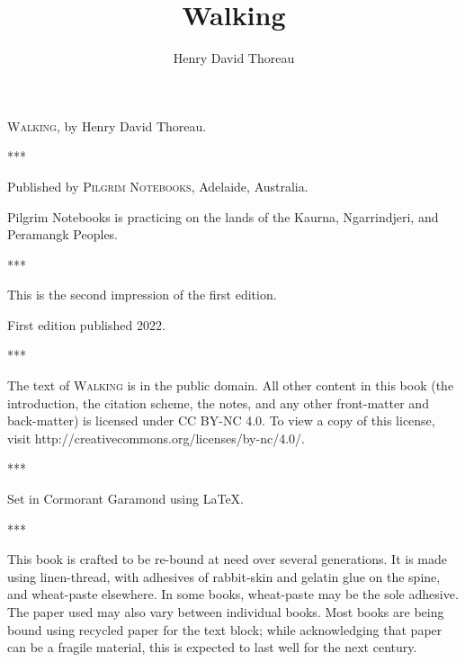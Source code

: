\documentclass[twoside,openright,10pt]{memoir} %
\title{Walking}
\author{Henry David Thoreau}
\date{}
\begin{document}
\mbox{}
\thispagestyle{cleared}
\newpage

\begin{center}
\thispagestyle{cleared}
\small
  \textsc{Walking}, by Henry David Thoreau.

  ***

  Published by \textsc{Pilgrim Notebooks}, Adelaide, Australia.

  Pilgrim Notebooks is practicing on the lands of the Kaurna, Ngarrindjeri, and Peramangk Peoples.

  ***

  This is the second impression of the first edition.

  First edition published 2022.

  ***

  The text of \textsc{Walking} is in the public domain. All other content in this book  (the introduction, the citation scheme, the notes, and any other front-matter and back-matter) is licensed under CC BY-NC 4.0. To view a copy of this license, visit http://creativecommons.org/licenses/by-nc/4.0/.
  
  ***

  Set in Cormorant Garamond using \LaTeX .
  
  ***
  
  This book is crafted to be re-bound at need over several generations. It is made using linen-thread, with adhesives of rabbit-skin and gelatin glue on the spine, and wheat-paste elsewhere. In some books, wheat-paste may be the sole adhesive. The paper used may also vary between individual books. Most books are being bound using recycled paper for the text block; while acknowledging that paper can be a fragile material, this is expected to last well for the next century. \normalsize
\end{center}

\maketitle
\thispagestyle{cleared}
\newpage

\tableofcontents*
{}
\end{document}
